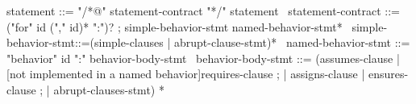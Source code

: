 \begin{syntax}
  statement ::= "/*@" statement-contract "*/" statement
  \
  statement-contract ::= {("for" id ("," id)* ":")?} ;
    simple-behavior-stmt named-behavior-stmt*
  \
  simple-behavior-stmt::=(simple-clauses | abrupt-clause-stmt)*
  \
  named-behavior-stmt ::= "behavior" id ":" behavior-body-stmt
  \
  behavior-body-stmt ::= (assumes-clause |
                     {[not implemented in a named behavior]requires-clause} ;
                    | assigns-clause | ensures-clause ;
                    | abrupt-clauses-stmt) *
\end{syntax}
